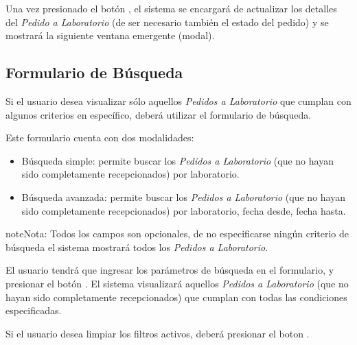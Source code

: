 \documentclass[a4paper,10pt,spanish]{sphinxmanual}
\begin{document}
Una vez presionado el botón , el sistema se encargará de actualizar los detalles del \emph{Pedido a Laboratorio} (de ser necesario también el estado del pedido) y se mostrará la siguiente ventana emergente (modal).



\subsection{Formulario de Búsqueda}
\label{receppedidosdelab:formulario-busqueda-rpl}\label{receppedidosdelab:formulario-de-busqueda}
Si el usuario desea visualizar sólo aquellos \emph{Pedidos a Laboratorio} que cumplan con algunos criterios en específico, deberá utilizar el formulario de búsqueda.


Este formulario cuenta con dos modalidades:
\begin{itemize}
\item {} 
Búsqueda simple: permite buscar los \emph{Pedidos a Laboratorio} (que no hayan sido completamente recepcionados) por laboratorio.

\item {} 
Búsqueda avanzada: permite buscar los \emph{Pedidos a Laboratorio} (que no hayan sido completamente recepcionados) por laboratorio, fecha desde, fecha hasta.

\end{itemize}

\begin{notice}{note}{Nota:}
Todos los campos son opcionales, de no especificarse ningún criterio de búsqueda el sistema mostrará todos los \emph{Pedidos a Laboratorio}.
\end{notice}

El usuario tendrá que ingresar los parámetros de búsqueda en el formulario, y presionar el botón . El sistema visualizará aquellos \emph{Pedidos a Laboratorio} (que no hayan sido completamente recepcionados) que cumplan con todas las condiciones especificadas.

Si el usuario desea limpiar los filtros activos, deberá presionar el boton .
\end{document}
